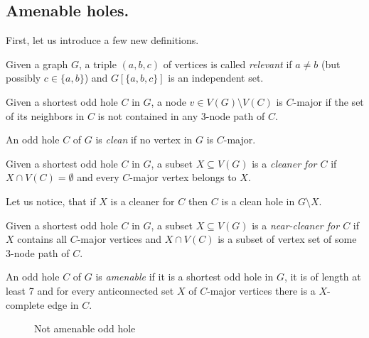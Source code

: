\subsection{Amenable holes.}
\label{AmenableHoles}

First, let us introduce a few new definitions.

\begin{defn}
	Given a graph $G$, a triple $(a, b, c)$ of vertices is called \emph{relevant} if $a \neq b$ (but possibly $c \in \{a, b\}$) and $G[\{a,b,c\}]$ is an independent set.
\end{defn}

\begin{defn}
  Given a shortest odd hole $C$ in $G$, a node $v \in V(G) \setminus V(C)$ is $C$-major if the set of its neighbors in $C$ is not contained in any 3-node path of $C$.
\end{defn}

\begin{defn}
  An odd hole $C$ of $G$ is \emph{clean} if no vertex in $G$ is $C$-major.
\end{defn}

\begin{defn}[cleaner]
  Given a shortest odd hole $C$ in $G$, a subset $X \subseteq V(G)$ is a \emph{cleaner for $C$} if $X \cap V(C) = \emptyset$ and every $C$-major vertex belongs to $X$.
\end{defn}

Let us notice, that if $X$ is a cleaner for $C$ then $C$ is a clean hole in $G \setminus X$.

\begin{defn}
  Given a shortest odd hole $C$ in $G$, a subset $X \subseteq V(G)$ is a \emph{near-cleaner for $C$} if $X$ contains all $C$-major vertices and $X \cap V(C)$ is a subset of vertex set of some 3-node path of $C$.
\end{defn}

\begin{defn}
  An odd hole $C$ of $G$ is \emph{amenable} if it is a shortest odd hole in $G$, it is of length at least 7 and for every anticonnected set $X$ of $C$-major vertices there is a $X$-complete edge in $C$.
\end{defn}

\begin{figure}
  \begin{minipage}{.5\textwidth}
      
			\label{fig:amenableOddHole}
  \end{minipage}%
  \begin{minipage}{.5\textwidth}
      
			\caption{Not amenable odd hole}
			\label{fig:notAmenableHole}
  \end{minipage}
  \end{figure}

